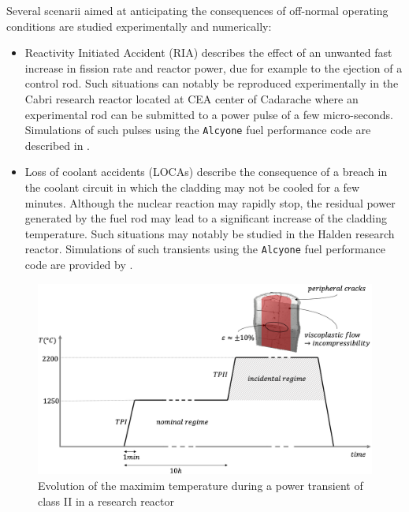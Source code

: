 Several scenarii aimed at anticipating the consequences of off-normal
operating conditions are studied experimentally and numerically:

\begin{itemize}
  \item Reactivity Initiated Accident (RIA) describes the effect of an
  unwanted fast increase in fission rate and reactor power, due for
  example to the ejection of a control rod. Such situations can notably
  be reproduced experimentally in the Cabri research reactor located at
  CEA center of Cadarache where an experimental rod can be submitted to
  a power pulse of a few micro-seconds. Simulations of such pulses using
  the \texttt{Alcyone} fuel performance code are described in
  \cite{guenot-delahaie_simulation_2017}.
  \item Loss of coolant accidents (LOCAs) describe the consequence of a
  breach in the coolant circuit in which the cladding may not be cooled
  for a few minutes. Although the nuclear reaction may rapidly stop, the
  residual power generated by the fuel rod may lead to a significant
  increase of the cladding temperature. Such situations may notably be
  studied in the Halden research reactor. Simulations of such transients
  using the \texttt{Alcyone} fuel performance code are provided by
  \cite{struzik_simulation_2017}.
\end{itemize}


\begin{figure}[H]
  \centering
  \includegraphics[width=10.cm]{../chapter_000_introduction/figures/TransientPowerClassII.png}
  \caption{Evolution of the maximim temperature during a power transient of class II in a research reactor}
  \label{fig:hho:transient_power}
\end{figure}

